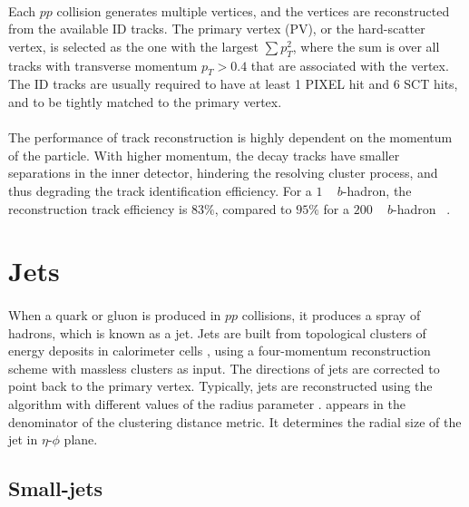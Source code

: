 \paragraph{}
Each $pp$ collision generates multiple vertices, and the vertices are reconstructed from the available ID tracks. 
The primary vertex (PV), or the hard-scatter vertex, is selected as the one with the largest $\sum p_T^2$, where the sum is over all tracks with transverse momentum $p_T > 0.4$ \GeV that are associated with the vertex.
The ID tracks are usually required to have at least 1 PIXEL hit and 6 SCT hits, and to be tightly matched to the primary vertex. 

\paragraph{}
The performance of track reconstruction is highly dependent on the momentum of the particle. 
With higher momentum, the decay tracks have smaller separations in the inner detector, hindering the resolving cluster process, and thus degrading the track identification efficiency. 
For a $1$ \TeV~ $b$-hadron, the reconstruction track efficiency is $83\%$, compared to $95\%$ for a $200$ \GeV~ $b$-hadron ~\cite{Aaboud:2017all}.

\section{Jets}
\paragraph{}
When a quark or gluon is produced in $pp$ collisions, it produces a spray of hadrons, which is known as a jet. 
Jets are built from topological clusters of energy deposits in calorimeter cells \cite{PERF-2014-07}, using a four-momentum reconstruction scheme with massless clusters as input. 
The directions of jets are corrected to point back to the primary vertex.
Typically, jets are reconstructed using the \akt algorithm with different values of the radius parameter \R. 
\R appears in the denominator of the clustering distance metric. 
It determines the radial size of the jet in $\eta$-$\phi$ plane.

\subsection{Small-\R jets}
